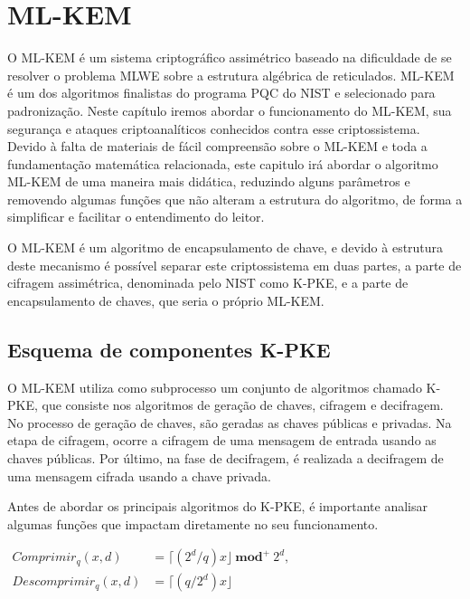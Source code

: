 \chapter{ML-KEM}
\label{cap:ml_kem}

    O \ac{ML-KEM} \cite{kyber} é um sistema criptográfico assimétrico baseado na dificuldade de se resolver o problema \ac{MLWE} sobre a estrutura algébrica de reticulados. \ac{ML-KEM} é um dos algoritmos finalistas do programa PQC do \ac{NIST} e selecionado para padronização. Neste capítulo iremos abordar o funcionamento do \ac{ML-KEM}, sua segurança e ataques criptoanalíticos conhecidos contra esse criptossistema. Devido à falta de materiais de fácil compreensão sobre o \ac{ML-KEM} e toda a fundamentação matemática relacionada, este capitulo irá abordar o algoritmo \ac{ML-KEM} de uma maneira mais didática, reduzindo alguns parâmetros e removendo algumas funções que não alteram a estrutura do algoritmo, de forma a simplificar e facilitar o entendimento do leitor.

    O \ac{ML-KEM} é um algoritmo de encapsulamento de chave, e devido à estrutura deste mecanismo é possível separar este criptossistema em duas partes, a parte de cifragem assimétrica, denominada pelo \ac{NIST} como K-PKE, e a parte de encapsulamento de chaves, que seria o próprio \ac{ML-KEM}.

    \section{Esquema de componentes K-PKE}
    \label{sec:k-pke}
    O \ac{ML-KEM} utiliza como subprocesso um conjunto de algoritmos chamado K-PKE, que consiste nos algoritmos de geração de chaves, cifragem e decifragem. No processo de geração de chaves, são geradas as chaves públicas e privadas. Na etapa de cifragem, ocorre a cifragem de uma mensagem de entrada usando as chaves públicas. Por último, na fase de decifragem, é realizada a decifragem de uma mensagem cifrada usando a chave privada.

    Antes de abordar os principais algoritmos do K-PKE, é importante analisar algumas funções que impactam diretamente no seu funcionamento. 
   
    \begin{center}
        $\begin{array}{rl}
            Comprimir_{q}(x,d) &= \lceil (2^d / q) x \rfloor\  \textbf{mod}^{+}\ 2^d,\\
            Descomprimir_{q}(x,d) &= \lceil (q/2^d) x \rfloor
        \end{array}$
    \end{center}

